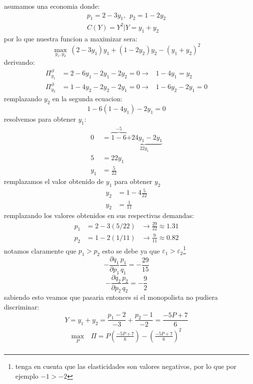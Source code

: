 \documentclass[11pt]{article}
\begin{document}
\begin{itemize}
    \begin{example}
    \begin{flushleft}
        asumamos una economia donde:
        \begin{align*}
            p_1 = 2-3y_1,~~p_2=1-2y_2\\
            C(Y)=Y^2|Y=y_1+y_2
        \end{align*}
        por lo que nuestra funcion a maximizar sera:
        $$\max_{y_1,y_2}~(2-3y_1)y_1+(1-2y_2)y_2-(y_1+y_2)^2$$
        derivando:
        \begin{align*}
            \Pi_{y_1}^\partial &= 2-6y_1-2y_1-2y_2= 0 \to& 1-4y_1 = y_2\\
            \Pi_{y_2}^\partial &= 1-4y_2-2y_2-2y_1=0 \to& 1-6y_2-2y_1=0
        \end{align*}
        remplazando $y_2$ en la segunda ecuacion:
        $$1-6(1-4y_1)-2y_1=0$$
        resolvemos para obtener $y_1$:
        \begin{align*}
            0&=\overbrace{1-6}^{-5}\underbrace{+24y_1-2y_1}_{22y_1}\\
            5&=22y_1\\
            y_1&=\frac{5}{22}
        \end{align*}
        remplazamos el valor obtenido de $y_1$ para obtener $y_2$
        \begin{align*}
            y_2&=1-4\frac{5}{22}\\
            y_2&=\frac{1}{11}
        \end{align*}
        remplazando los valores obtenidos en sus respectivas demandas:
        \begin{align*}
            p_1&=2-3(5/22) &\to \frac{29}{22} \approx 1.31\\
            p_2&=1-2(1/11) &\to \frac{9}{11} \approx 0.82
        \end{align*}
        notamos claramente que $p_1>p_2$ esto se debe ya que $\varepsilon_1>\varepsilon_2$\footnote{tenga en cuenta que las elasticidades son valores negativos, por lo que por ejemplo $-1>-2$}
        $$-\frac{\partial q_1}{\partial p_1}\frac{p_1}{q_1}=-\frac{29}{15}$$
        $$-\frac{\partial q_2}{\partial p_2}\frac{p_2}{q_2}=-\frac{9}{2}$$
        sabiendo esto veamos que pasaria entonces si el monopolista no pudiera discriminar:
        $$Y=y_1+y_2 = \frac{p_1-2}{-3}+\frac{p_2-1}{-2}=\frac{-5P+7}{6}$$
        \begin{align*}
            \max_P~&\Pi=P\left(\frac{-5P+7}{6}\right)-\left(\frac{-5P+7}{6}\right)^2\\

\end{align*}
\end{flushleft}
\end{example}
\end{itemize}
\end{document}
